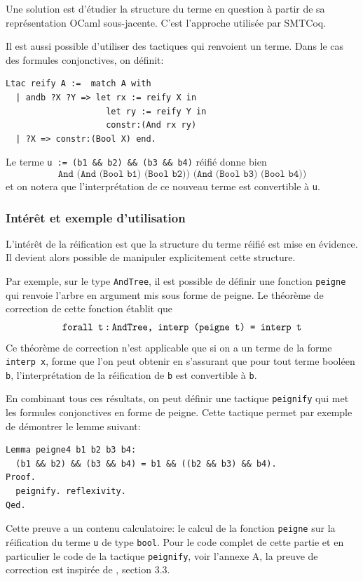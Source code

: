 \documentclass[11pt]{article}
\begin{document}
Une solution est d'étudier la structure du terme en question à partir de sa représentation OCaml sous-jacente. C'est l'approche utilisée par SMTCoq. \medbreak

Il est aussi possible d'utiliser des tactiques qui renvoient un terme. Dans le cas des formules conjonctives, on définit:
\begin{lstlisting}[frame=single]
Ltac reify A :=  match A with
  | andb ?X ?Y => let rx := reify X in
                    let ry := reify Y in
                    constr:(And rx ry)
  | ?X => constr:(Bool X) end.

\end{lstlisting}
Le terme \texttt{u := (b1 \&\& b2) \&\& (b3 \&\& b4)} réifié donne bien 
\[\texttt{And (And (Bool b1) (Bool b2)) (And (Bool b3) (Bool b4))}\] 
et on notera que l'interprétation de ce nouveau terme est convertible à \texttt{u}.




\subsubsection{Intérêt et exemple d'utilisation} \label{interet_reification}

L'intérêt de la réification est que la structure du terme réifié est mise en évidence. Il devient alors possible de manipuler explicitement cette structure. \medbreak

Par exemple, sur le type \texttt{AndTree}, il est possible de définir une fonction \texttt{peigne} qui renvoie l'arbre en argument mis sous forme de peigne. Le théorème de correction de cette fonction établit que
\[ \texttt{forall t\,:\,AndTree, interp (peigne t) = interp t} \]
Ce théorème de correction n'est applicable que si on a un terme de la forme \texttt{interp x}, forme que l'on peut obtenir en s'assurant que pour tout terme booléen \texttt{b}, l'interprétation de la réification de \texttt{b} est convertible à \texttt{b}.\medbreak

En combinant tous ces résultats, on peut définir une tactique \texttt{peignify} qui met les formules conjonctives en forme de peigne. Cette tactique permet par exemple de démontrer le lemme suivant: 
\begin{lstlisting}[frame=single]
Lemma peigne4 b1 b2 b3 b4:
  (b1 && b2) && (b3 && b4) = b1 && ((b2 && b3) && b4).
Proof.
  peignify. reflexivity.
Qed.
\end{lstlisting}
Cette preuve a un contenu calculatoire: le calcul de la fonction \texttt{peigne} sur la réification du terme \texttt{u} de type \texttt{bool}. Pour le code complet de cette partie et en particulier le code de la tactique \texttt{peignify}, voir l'annexe A, la preuve de correction est inspirée de \cite{coq_intro}, section 3.3.
\end{document}
